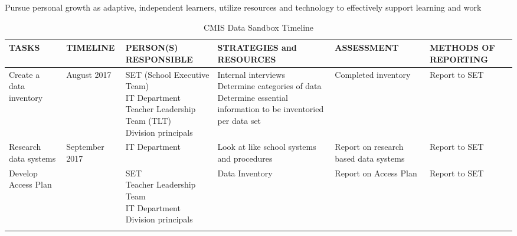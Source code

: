 Pursue personal growth as adaptive, independent learners, utilize resources and technology to effectively support learning and work 
\begin{landscape}
\begin{table}[h]
\centering
\caption{CMIS Data Sandbox Timeline}
\label{table:1}
\begin{tabu} to 8in {|X|X|X[2]|X[2]|X[2]|X|}
\hline
TASKS &
TIMELINE &
PERSON(S) RESPONSIBLE &
STRATEGIES and RESOURCES &
ASSESSMENT &
METHODS OF REPORTING  \\
\hline

Create a data inventory &
August 2017 &
\parbox[t]{4cm}{
SET (School Executive Team) \\ 
IT Department \\
Teacher Leadership Team (TLT) \\ 
Division principals}  &
\parbox[t]{4cm}{
Internal interviews \\
Determine categories of data \\
Determine essential information to be inventoried per data set} &
Completed inventory &
Report to SET \\
\hline

Research data systems &
September 2017 &
IT Department &
Look at like school systems and procedures &
Report on research based data systems &
Report to SET \\
\hline

Develop Access Plan &
&
\parbox[t]{4cm}{
SET \\
Teacher Leadership Team \\
IT Department \\
Division principals} &
Data Inventory  &
Report on Access Plan &
Report to SET \\
\hline
{}
\end{tabu}
\end{table}
\end{landscape}

